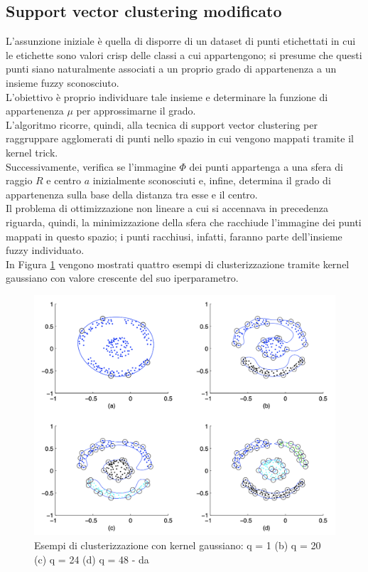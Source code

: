 \documentclass[12pt]{report}
\theoremstyle{definition}
\begin{document}
\subsection{Support vector clustering modificato}
L'assunzione iniziale è quella di disporre di un dataset di punti etichettati in cui le etichette sono valori crisp delle classi a cui appartengono; si presume che questi punti siano naturalmente associati a un proprio grado di appartenenza a un insieme fuzzy sconosciuto.
\\
L'obiettivo è proprio individuare tale insieme e determinare la funzione di appartenenza $\mu$ per approssimarne il grado.
\\
L'algoritmo ricorre, quindi, alla tecnica di support vector clustering \cite{23} per raggruppare agglomerati di punti nello spazio in cui vengono mappati tramite il kernel trick.
\\
Successivamente, verifica se l'immagine $\mathit{\Phi}$ dei punti appartenga a una sfera di raggio $R$ e centro $a$ inizialmente sconosciuti e, infine, determina il grado di appartenenza sulla base della distanza tra esse e il centro.
\\
Il problema di ottimizzazione non lineare a cui si accennava in precedenza riguarda, quindi, la minimizzazione della sfera che racchiude l'immagine dei punti mappati in questo spazio; i punti racchiusi, infatti, faranno parte dell'insieme fuzzy individuato.
\\
In Figura \ref{gaussian} vengono mostrati quattro esempi di clusterizzazione tramite kernel gaussiano con valore crescente del suo iperparametro.
\\
\begin{figure}[!ht]
    \centering
    \includegraphics[scale = 0.75]{images/gaussian_kernel.png}
    \caption{Esempi di clusterizzazione con kernel gaussiano:
    q = 1 (b) q = 20 (c) q = 24 (d) q = 48 - da \cite{23}}
    \label{gaussian}
\end{figure}
\end{document}
